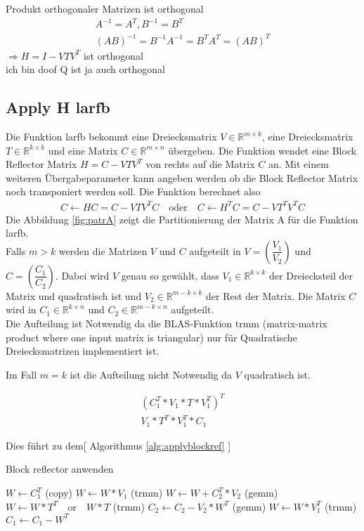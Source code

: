 Produkt orthogonaler Matrizen ist orthogonal 
\begin{align*}
	A^{-1} = A^T, B^{-1} = B^T\\
	(AB)^{-1} = B^{-1}A^{-1} = B^TA^T = (AB)^T
\end{align*}
$\Rightarrow H=I-VTV^T$ ist orthogonal\\
ich bin doof Q ist ja auch orthogonal

\subsection{Apply H larfb}

Die Funktion larfb bekommt eine Dreiecksmatrix $V \in \mathbb{R}^{m \times k}$, eine Dreiecksmatrix $T \in \mathbb{R}^{k \times k}$ und eine Matrix $C \in \mathbb{R}^{m \times n }$ übergeben.
Die Funktion wendet eine  Block Reflector Matrix $ 	H = C - V T V^T $ von rechts auf die Matrix $ C $ an. 
Mit einem weiteren Übergabeparameter kann angeben werden ob die Block Reflector Matrix noch transponiert werden soll.
Die Funktion berechnet also
\begin{align*}
	C \leftarrow H C = C - V T V^T C \quad \text{oder} \quad 	C \leftarrow H^T C = C - V T^T V^T C
\end{align*}
Die Abbildung \ref{fig:patrA} zeigt die Partitionierung der Matrix A für die Funktion larfb.\\
Falls $m > k $ werden die Matrizen $V$ und $C$ aufgeteilt in $V=\left(\dfrac{V_1}{V_2}\right)$ und $C=\left(\dfrac{C_1}{C_2}\right)$. Dabei wird $V$ genau so gewählt, dass $V_1 \in \mathbb{R}^{k\times k}$ der Dreiecksteil der Matrix und quadratisch ist und $V_2 \in \mathbb{R}^{m-k\times k}$ der Rest der Matrix. Die Matrix $C$ wird in $C_1 \in \mathbb{R}^{k \times n}$ und $C_2 \in \mathbb{R}^{m-k \times n}$  aufgeteilt.\\
Die Aufteilung ist Notwendig da die BLAS-Funktion trmm (matrix-matrix product where one input matrix is triangular) nur für Quadratische Dreiecksmatrizen implementiert ist.

Im Fall $ m = k $ ist die Aufteilung nicht Notwendig da $ V $ quadratisch ist.

\begin{align*}
	(C_1^T * V_1 * T *V_1^T)^T\\
	V_1 * T^T * V_1^T * C_1
\end{align*}



Dies führt zu dem[ Algorithmus \ref{alg:applyblockref} ]\\
\begin{algorithm}
	\caption{Block reflector anwenden}
	\label{alg:applyblockref}
	\begin{algorithmic}
		\State 	$W \leftarrow C_1^T$ (copy)
		\State	$W \leftarrow W * V_1 $ (trmm)
			\State $W \leftarrow W + C_2^T*V_2$ (gemm)
		\EndIf
		\State 	$ W \leftarrow W * T^T \quad \text{or}\quad  W * T$ (trmm)
			\State $C_2 \leftarrow C_2 - V_2 * W^T$ (gemm)
		\EndIf
		\State 	$ W \leftarrow W * V_1^T $ (trmm)
		\State 	$ C_1 \leftarrow C_1 - W^T $
	\end{algorithmic}
\end{algorithm}


